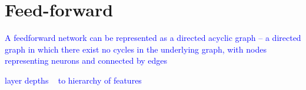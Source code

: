 \section{Feed-forward}

\textcolor{blue}{A feedforward network can be represented as a directed acyclic graph -- a directed graph in which there exist no cycles in the underlying graph, with nodes representing neurons and connected by edges}

\textcolor{blue}{layer depths ~ to hierarchy of features}





